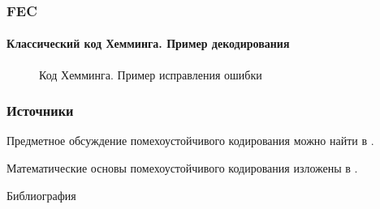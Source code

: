 \begin{frame}
    \frametitle{FEC}
    \framesubtitle{Классический код Хемминга. Пример декодирования}
    
    \begin{figure}
        \begin{center}
            \caption{Код Хемминга. Пример исправления ошибки}\label{pict:hammingDecode}
        \end{center}
    \end{figure} 
\end{frame}


\appendix


\begin{frame}
    \frametitle{Источники}
    
    Предметное обсуждение помехоустойчивого кодирования можно найти в \cite{bib:verner:codingBase}.
    
    Математические основы помехоустойчивого кодирования изложены в \cite{bib:novic:discrmathprogrammer,bib:yablonsky:discreteintro}.
\end{frame}


\begin{frame}[allowframebreaks]{Библиография}
    
    
\end{frame}

